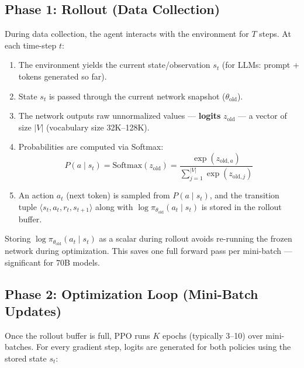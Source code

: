 \subsection{Phase 1: Rollout (Data Collection)}
\label{phase-1-rollout-data-collection}

During data collection, the agent interacts with the environment for $T$ steps. At each time-step $t$:

\begin{enumerate}
  \item The environment yields the current state/observation $s_t$ (for LLMs: prompt + tokens generated so far).
  \item State $s_t$ is passed through the current network snapshot ($\theta_{\text{old}}$).
  \item The network outputs raw unnormalized values --- \textbf{logits} $z_{\text{old}}$ --- a vector of size $|V|$ (vocabulary size 32K--128K).
  \item Probabilities are computed via Softmax: 
\begin{equation}
\boxed{P(a \mid s_t) = \text{Softmax}(z_{\text{old}}) = \frac{\exp(z_{\text{old}, a})}{\sum_{j=1}^{|V|} \exp(z_{\text{old}, j})}}
\end{equation}
  \item An action $a_t$ (next token) is sampled from $P(a \mid s_t)$, and the transition tuple $\langle s_t, a_t, r_t, s_{t+1} \rangle$ along with $\log \pi_{\theta_{\text{old}}}(a_t \mid s_t)$ is stored in the rollout buffer.
\end{enumerate}

\begin{intuitionbox}
Storing $\log \pi_{\theta_{\text{old}}}(a_t \mid s_t)$ as a scalar during rollout avoids re-running the frozen network during optimization. This saves one full forward pass per mini-batch --- significant for 70B models.
\end{intuitionbox}

\subsection{Phase 2: Optimization Loop (Mini-Batch Updates)}
\label{phase-2-optimization-loop-mini-batch-updates}

Once the rollout buffer is full, PPO runs $K$ epochs (typically 3--10) over mini-batches. For every gradient step, logits are generated for both policies using the stored state $s_t$:

